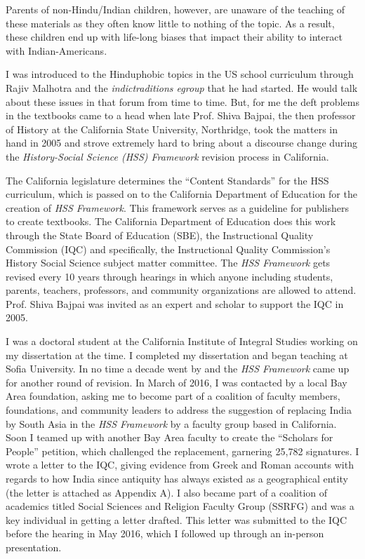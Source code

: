 Parents of non-Hindu/Indian children, however, are unaware of the teaching of these materials as they often know little to nothing of the topic. As a result, these children end up with life-long biases that impact their ability to interact with Indian-Americans.

I was introduced to the Hinduphobic topics in the US school curriculum through Rajiv Malhotra and the \textit{indictraditions egroup} that he had started. He would talk about these issues in that forum from time to time. But, for me the deft problems in the textbooks came to a head when late Prof. Shiva Bajpai, the then professor of History at the California State University, Northridge, took the matters in hand in 2005 and strove extremely hard to bring about a discourse change during the \textit{History-Social Science (HSS) Framework} revision process in California. 

The California legislature determines the “Content Standards” for the HSS curriculum, which is passed on to the California Department of Education for the creation of \textit{HSS Framework}. This framework serves as a guideline for publishers to create textbooks. The California Department of Education does this work through the State Board of Education (SBE), the Instructional Quality Commission (IQC) and specifically, the Instructional Quality Commission’s History Social Science subject matter committee. The \textit{HSS Framework} gets revised every 10 years through hearings in which anyone including students, parents, teachers, professors, and community organizations are allowed to attend. Prof. Shiva Bajpai was invited as an expert and scholar to support the IQC in 2005. 

I was a doctoral student at the California Institute of Integral Studies working on my dissertation at the time. I completed my dissertation and began teaching at Sofia University. In no time a decade went by and the \textit{HSS Framework} came up for another round of revision. In March of 2016, I was contacted by a local Bay Area foundation, asking me to become part of a coalition of faculty members, foundations, and community leaders to address the suggestion of replacing India by South Asia in the \textit{HSS Framework} by a faculty group based in California. Soon I teamed up with another Bay Area faculty to create the “Scholars for People” petition, which challenged the replacement, garnering 25,782 signatures. I wrote a letter to the IQC, giving evidence from Greek and Roman accounts with regards to how India since antiquity has always existed as a geographical entity (the letter is attached as Appendix A). I also became part of a coalition of academics titled Social Sciences and Religion Faculty Group (SSRFG) and was a key individual in getting a letter drafted. This letter was submitted to the IQC before the hearing in May 2016, which I followed up through an in-person presentation. 

